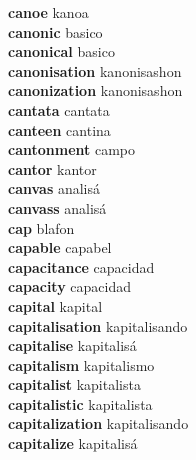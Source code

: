 \textbf{canoe } kanoa \\
\textbf{canonic } basico \\
\textbf{canonical } basico \\
\textbf{canonisation } kanonisashon \\
\textbf{canonization } kanonisashon \\
\textbf{cantata } cantata \\
\textbf{canteen } cantina \\
\textbf{cantonment } campo \\
\textbf{cantor } kantor \\
\textbf{canvas } analisá \\
\textbf{canvass } analisá \\
\textbf{cap } blafon \\
\textbf{capable } capabel \\
\textbf{capacitance } capacidad \\
\textbf{capacity } capacidad \\
\textbf{capital } kapital \\
\textbf{capitalisation } kapitalisando \\
\textbf{capitalise } kapitalisá \\
\textbf{capitalism } kapitalismo \\
\textbf{capitalist } kapitalista \\
\textbf{capitalistic } kapitalista \\
\textbf{capitalization } kapitalisando \\
\textbf{capitalize } kapitalisá \\
